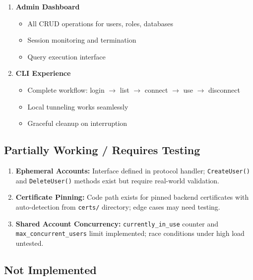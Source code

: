 \begin{enumerate}
    \item \textbf{Admin Dashboard}
    \begin{itemize}
        \item All CRUD operations for users, roles, databases
        \item Session monitoring and termination
        \item Query execution interface
    \end{itemize}
    
    \item \textbf{CLI Experience}
    \begin{itemize}
        \item Complete workflow: login $\rightarrow$ list $\rightarrow$ connect $\rightarrow$ use $\rightarrow$ disconnect
        \item Local tunneling works seamlessly
        \item Graceful cleanup on interruption
    \end{itemize}
\end{enumerate}

\subsection{Partially Working / Requires Testing}

\begin{enumerate}
    \item \textbf{Ephemeral Accounts:} Interface defined in protocol handler; \texttt{CreateUser()} and \texttt{DeleteUser()} methods exist but require real-world validation.
    
    \item \textbf{Certificate Pinning:} Code path exists for pinned backend certificates with auto-detection from \texttt{certs/} directory; edge cases may need testing.
    
    \item \textbf{Shared Account Concurrency:} \texttt{currently\_in\_use} counter and \texttt{max\_concurrent\_users} limit implemented; race conditions under high load untested.
\end{enumerate}

\subsection{Not Implemented}

